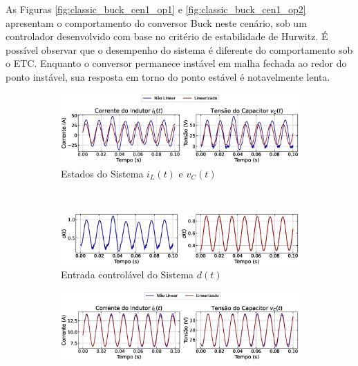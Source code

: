 As Figuras \ref{fig:classic_buck_cen1_op1} e \ref{fig:classic_buck_cen1_op2} apresentam o comportamento do conversor Buck neste cenário, sob um controlador desenvolvido com base no critério de estabilidade de Hurwitz. É possível observar que o desempenho do sistema é diferente do comportamento sob o ETC. Enquanto o conversor permanece instável em malha fechada ao redor do ponto instável, sua resposta em torno do ponto estável é notavelmente lenta.

\begin{figure}[H]
  \centering
  \captionsetup{justification=centering}
  \begin{subfigure}{1.\textwidth}
    \centering
    \includegraphics[width=1.\textwidth]{figuras/classic/buck/sim1/op1/result.eps}
    \caption{Estados do Sistema $i_L(t)$  e $v_C(t)$}
  \end{subfigure}
  \\[6pt]
  \begin{subfigure}{1.\textwidth}
    \centering
    \includegraphics[width=1.\textwidth]{figuras/classic/buck/sim1/op1/duty-cycle.eps}
    \caption{Entrada controlável do Sistema $d(t)$}
  \end{subfigure}
  \caption{Conversor Buck no Cenário 1 operando em torno de $P_{\mathrm{o}, 1}$ sob controlador projetado utilizando o critério de estabilidade de Hurwitz.}
  \label{fig:classic_buck_cen1_op1}
  \begin{subfigure}{1.\textwidth}
    \centering
    \includegraphics[width=1.\textwidth]{figuras/classic/buck/sim1/op2/result.eps}

\end{subfigure}
\end{figure}
